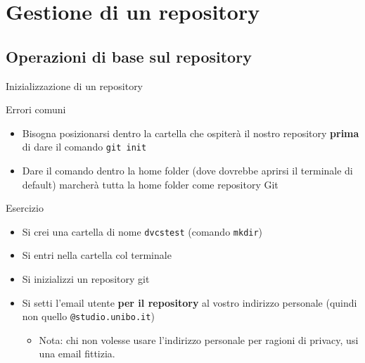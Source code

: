 \documentclass[presentation]{beamer}
\begin{document}
\section{Gestione di un repository}

\subsection{Operazioni di base sul repository}

\begin{frame}[allowframebreaks]{Inizializzazione di un repository}
	\begin{block}{Errori comuni}
		\begin{itemize}
			\item Bisogna posizionarsi dentro la cartella che ospiterà il nostro repository \textbf{prima} di dare il comando \texttt{git init}
			\item Dare il comando dentro la home folder (dove dovrebbe aprirsi il terminale di default) marcherà tutta la home folder come repository Git
		\end{itemize}
	\end{block}
	\begin{block}{Esercizio}
		\begin{itemize}
			\item Si crei una cartella di nome \texttt{dvcstest} (comando \texttt{mkdir})
			\item Si entri nella cartella col terminale
			\item Si inizializzi un repository git
			\item Si setti l'email utente \textbf{per il repository} al vostro indirizzo personale (quindi non quello \texttt{@studio.unibo.it})
			\begin{itemize}
				\item Nota: chi non volesse usare l'indirizzo personale per ragioni di privacy, usi una email fittizia.
			\end{itemize}
		\end{itemize}
	\end{block}
\end{frame}
\end{document}

